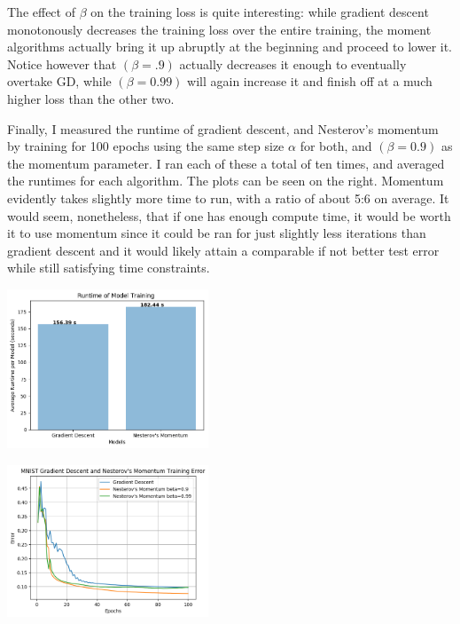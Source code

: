 \documentclass[10pt]{article}
\begin{document}
\begin{multicols}{2}
The effect of $\beta$ on the training loss is quite interesting: while gradient descent monotonously decreases the training loss over the entire training, the moment algorithms actually bring it up abruptly at the beginning and proceed to lower it. Notice however that $(\beta=.9)$ actually decreases it enough to eventually overtake GD, while $(\beta=0.99)$ will again increase it and finish off at a much higher loss than the other two. \par
Finally, I measured the runtime of gradient descent, and Nesterov's momentum by training for 100 epochs using the same step size $\alpha$ for both, and $(\beta=0.9)$ as the momentum parameter. I ran each of these a total of ten times, and averaged the runtimes for each algorithm. The plots can be seen on the right. Momentum evidently takes slightly more time to run, with a ratio of about 5:6 on average. It would seem, nonetheless, that if one has enough compute time, it would be worth it to use momentum since it could be ran for just slightly less iterations than gradient descent and it would likely attain a comparable if not better test error while still satisfying time constraints.\par
\begin{center}
    \includegraphics[width=0.45\textwidth]{train_time_part1.png}
\end{center}
\begin{center}
    \includegraphics[width=0.45\textwidth]{GradientDescentandNesterov'sMomentumTrainingError.png}
\end{center}
\begin{center}

\end{center}
\end{multicols}
\end{document}
